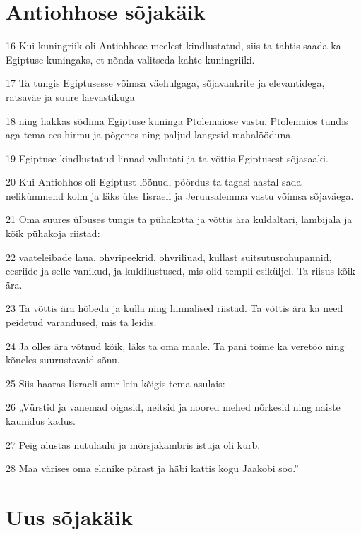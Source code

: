 \section*{Antiohhose sõjakäik}

\par 16 Kui kuningriik oli Antiohhose meelest kindlustatud, siis ta tahtis saada ka Egiptuse kuningaks, et nõnda valitseda kahte kuningriiki.
\par 17 Ta tungis Egiptusesse võimsa väehulgaga, sõjavankrite ja elevantidega, ratsaväe ja suure laevastikuga
\par 18 ning hakkas sõdima Egiptuse kuninga Ptolemaiose vastu. Ptolemaios tundis aga tema ees hirmu ja põgenes ning paljud langesid mahalööduna.
\par 19 Egiptuse kindlustatud linnad vallutati ja ta võttis Egiptusest sõjasaaki.
\par 20 Kui Antiohhos oli Egiptust löönud, pöördus ta tagasi aastal sada nelikümmend kolm ja läks üles Iisraeli ja Jeruusalemma vastu võimsa sõjaväega.
\par 21 Oma suures ülbuses tungis ta pühakotta ja võttis ära kuldaltari, lambijala ja kõik pühakoja riistad:
\par 22 vaateleibade laua, ohvripeekrid, ohvriliuad, kullast suitsutusrohupannid, eesriide ja selle vanikud, ja kuldilustused, mis olid templi esiküljel. Ta riisus kõik ära.
\par 23 Ta võttis ära hõbeda ja kulla ning hinnalised riistad. Ta võttis ära ka need peidetud varandused, mis ta leidis.
\par 24 Ja olles ära võtnud kõik, läks ta oma maale. Ta pani toime ka veretöö ning kõneles suurustavaid sõnu.
\par 25 Siis haaras Iisraeli suur lein kõigis tema asulais:
\par 26 „Vürstid ja vanemad oigasid, neitsid ja noored mehed nõrkesid ning naiste kaunidus kadus.
\par 27 Peig alustas nutulaulu ja mõrsjakambris istuja oli kurb.
\par 28 Maa värises oma elanike pärast ja häbi kattis kogu Jaakobi soo.” 

\section*{Uus sõjakäik}

